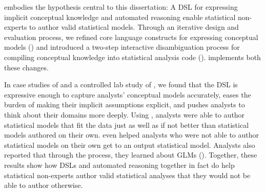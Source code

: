 \tisane embodies the hypothesis central to this dissertation: A DSL for
expressing implicit conceptual knowledge and automated reasoning enable
statistical non-experts to author valid statistical models. Through an iterative
design and evaluation process, we refined core language constructs for
expressing conceptual models (\thesisChallengeExplicit) and introduced a
two-step interactive disambiguation process for compiling conceptual knowledge
into statistical analysis code (\thesisChallengeRep). \rTisane implements both these
changes. 

In case studies of \tisane and a controlled lab study of \rTisane, we found that
the DSL is expressive enough to capture analysts' conceptual models accurately,
eases the burden of making their implicit assumptions explicit, and pushes
analysts to think about their domains more deeply. Using \rTisane, analysts were
able to author statistical models that fit the data just as well as
if not better than statistical models authored on their own. \rTisane even helped
analysts who were not able to author statistical models on their own get to an
output statistical model. Analysts also reported that through the process, they
learned about GLMs (\thesisChallengeUnderstanding). Together, these results show
how DSLs and automated reasoning together in fact do help statistical
non-experts author valid statistical analyses that they would not be
able to author otherwise.





